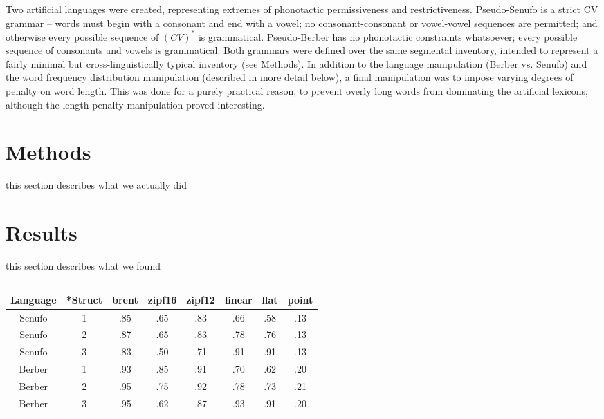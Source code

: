 \documentclass[11pt]{article}
\begin{document}
Two artificial languages were created, representing extremes of phonotactic permissiveness and restrictiveness. Pseudo-Senufo is a strict CV grammar -- words must begin with a consonant and end with a vowel; no consonant-consonant or vowel-vowel sequences are permitted; and otherwise every possible sequence of $(CV)^*$ is grammatical. Pseudo-Berber has no phonotactic constraints whatsoever; every possible sequence of consonants and vowels is grammatical. Both grammars were defined over the same segmental inventory, intended to represent a fairly minimal but cross-linguistically typical inventory (see Methods). In addition to the language manipulation (Berber vs. Senufo) and the word frequency distribution manipulation (described in more detail below), a final manipulation was to impose varying degrees of penalty on word length. This was done for a purely practical reason, to prevent overly long words from dominating the artificial lexicons; although the length penalty manipulation proved interesting.



\section{Methods}

this section describes what we actually did

\section{Results}

this section describes what we found

\begin{table}[h]
\begin{center}
\begin{tabular}{|c||c|cccccc|}
  \hline
  Language & *Struct & brent & zipf16 & zipf12 & linear & flat & point \\
  \hline
  Senufo & 1 & .85 & .65 & .83 & .66 & .58 & .13 \\
  Senufo & 2 & .87 & .65 & .83 & .78 & .76 & .13 \\
  Senufo & 3 & .83 & .50 & .71 & .91 & .91 & .13 \\
  \hline
  Berber & 1 & .93 & .85 & .91 & .70 & .62 & .20 \\
  Berber & 2 & .95 & .75 & .92 & .78 & .73 & .21 \\
  Berber & 3 & .95 & .62 & .87 & .93 & .91 & .20 \\
  \hline
\end{tabular}
\end{center}
\caption{\label{Results.}}
\end{table}
\end{document}

